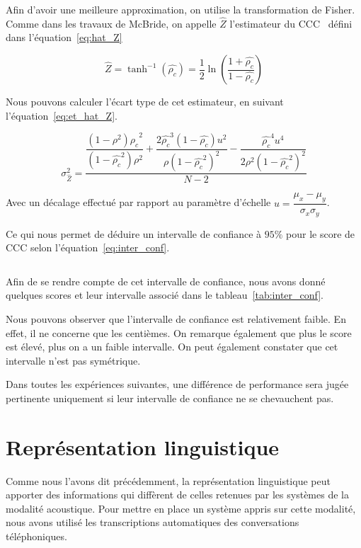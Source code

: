 Afin d'avoir une meilleure approximation, on utilise la transformation de Fisher. Comme dans les travaux de McBride, on appelle $\hat{Z}$ l'estimateur du CCC~\cite{McBride2005} défini dans l'équation~\ref{eq:hat_Z}

\begin{equation}
  \hat{Z} = \tanh^{-1}(\hat{\rho_c}) =  \dfrac{1}{2} \ln \left( \dfrac{1+ \hat{\rho_c} }{1 -\hat{\rho_c}}  \right)
  \label{eq:hat_Z}
\end{equation}

Nous pouvons calculer l'écart type de cet estimateur, en suivant l'équation~\ref{eq:et_hat_Z}.

\begin{equation}
\sigma_{\hat{Z} }^2 = \dfrac{\dfrac{(1-\rho^2) \hat{\rho_c} ^2}{(1-\hat{\rho_c}^2)\rho^2 } +  \dfrac{2\hat{\rho_c} ^3(1-\hat{\rho_c} )u^2}{\rho(1-\hat{\rho_c} ^2)^2} - \dfrac{\hat{\rho_c}^4 u^4}{2 \rho^2 (1-\hat{\rho_c}^2 )^2}}{N-2}
\label{eq:et_hat_Z}
\end{equation}

Avec un décalage effectué par rapport au paramètre d'échelle $u = \dfrac{\mu_x - \mu_y}{\sigma_x \sigma_y}$. %

Ce qui nous permet de déduire un intervalle de confiance à $95\%$ pour le score de CCC selon l'équation~\ref{eq:inter_conf}.

\begin{equation}
    [\tanh (\hat{Z} - 1.64 \sigma_{\hat{Z}}); \tanh(\hat{Z} + 1.64 \sigma_{\hat{Z}})]
    \label{eq:inter_conf}
\end{equation}

Afin de se rendre compte de cet intervalle de confiance, nous avons donné quelques scores et leur intervalle associé dans le tableau~\ref{tab:inter_conf}.



Nous pouvons observer que l'intervalle de confiance est relativement faible. En effet, il ne concerne que les centièmes. On remarque également que plus le score est élevé, plus on a un faible intervalle. On peut également constater que cet intervalle n'est pas symétrique.

Dans toutes les expériences suivantes, une différence de performance sera jugée pertinente uniquement si leur intervalle de confiance ne se chevauchent pas.

\section{Représentation linguistique}
Comme nous l'avons dit précédemment, la représentation linguistique peut apporter des informations qui diffèrent de celles retenues par les systèmes de la modalité acoustique. Pour mettre en place un système appris sur cette modalité, nous avons utilisé les transcriptions automatiques des conversations téléphoniques.


